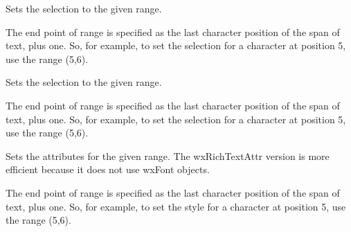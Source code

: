 \label{wxrichtextctrlsetselection}


Sets the selection to the given range.

The end point of range is specified as the last character position of the span of text, plus one.
So, for example, to set the selection for a character at position 5, use the range (5,6).

\label{wxrichtextctrlsetselectionrange}


Sets the selection to the given range.

The end point of range is specified as the last character position of the span of text, plus one.
So, for example, to set the selection for a character at position 5, use the range (5,6).

\label{wxrichtextctrlsetstyle}




Sets the attributes for the given range. The wxRichTextAttr version is more efficient
because it does not use wxFont objects.

The end point of range is specified as the last character position of the span of text, plus one.
So, for example, to set the style for a character at position 5, use the range (5,6).

\label{wxrichtextctrlsetstyleex}




